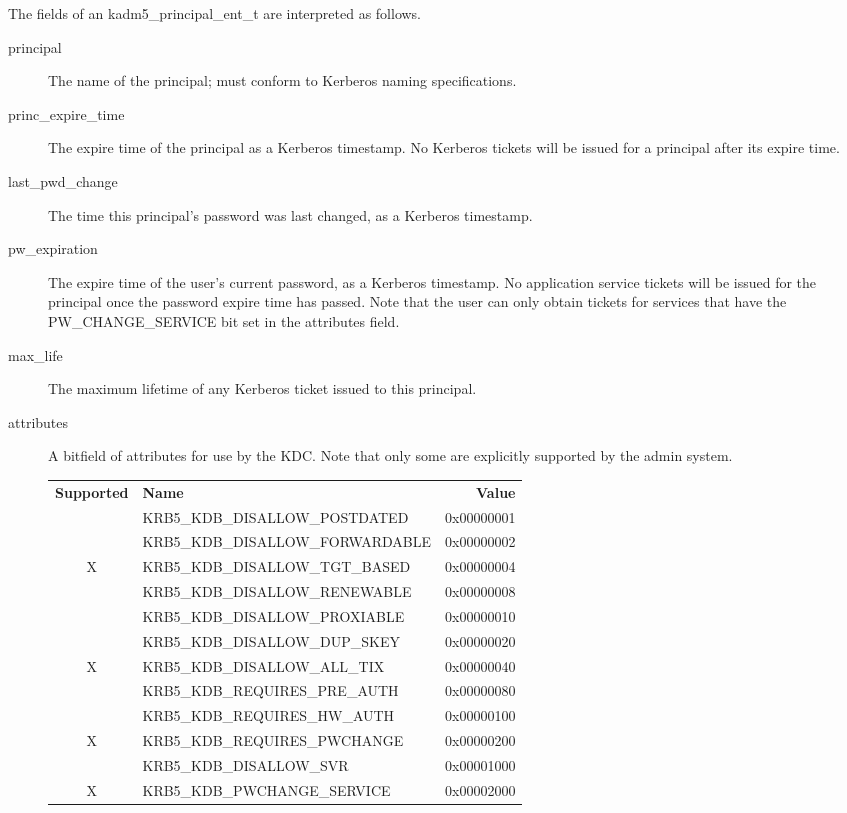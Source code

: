 The fields of an kadm5_principal_ent_t are interpreted as
follows.

\begin{description}
\item[principal] The name of the principal; must conform to Kerberos
naming specifications.

\item[princ_expire_time] The expire time of the principal as a Kerberos
timestamp.  No Kerberos tickets will be issued for a principal after
its expire time.

\item[last_pwd_change] The time this principal's password was last
changed, as a Kerberos timestamp.

\item[pw_expiration] The expire time of the user's current password, as a
Kerberos timestamp.  No application service tickets will be issued for the
principal once the password expire time has passed.  Note that the user can
only obtain tickets for services that have the PW_CHANGE_SERVICE bit set in
the attributes field.

\item[max_life] The maximum lifetime of any Kerberos ticket issued to
this principal.

\item[attributes] A bitfield of attributes for use by the KDC.  
Note that only some are explicitly supported by the admin system.

\begin{tabular}{clr}
{\bf Supported} & {\bf Name} & {\bf Value} \\
  & KRB5_KDB_DISALLOW_POSTDATED     & 0x00000001 \\
  & KRB5_KDB_DISALLOW_FORWARDABLE   & 0x00000002 \\
X & KRB5_KDB_DISALLOW_TGT_BASED     & 0x00000004 \\
  & KRB5_KDB_DISALLOW_RENEWABLE     & 0x00000008 \\
  & KRB5_KDB_DISALLOW_PROXIABLE     & 0x00000010 \\
  & KRB5_KDB_DISALLOW_DUP_SKEY      & 0x00000020 \\
X & KRB5_KDB_DISALLOW_ALL_TIX       & 0x00000040 \\
  & KRB5_KDB_REQUIRES_PRE_AUTH      & 0x00000080 \\
  & KRB5_KDB_REQUIRES_HW_AUTH       & 0x00000100 \\
X & KRB5_KDB_REQUIRES_PWCHANGE      & 0x00000200 \\
  & KRB5_KDB_DISALLOW_SVR           & 0x00001000 \\
X & KRB5_KDB_PWCHANGE_SERVICE       & 0x00002000
\end{tabular}


\end{description}
